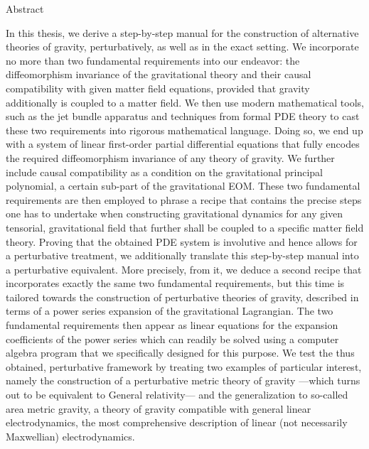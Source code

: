 \documentclass[a4paper,12pt, DIV=14, BCOR=5mm, twoside, headsepline, numbers=noenddot]{scrbook}
\newenvironment{abstract}{%
  \titlepage%
  \null\vfil%
  \begin{center}\normalfont\usekomafont{disposition}Abstract\end{center}%
}{%
  \par
  \vfil\null%
  \endtitlepage%
}
\begin{document}
\begin{abstract}
In this thesis, we derive a step-by-step manual for the construction of alternative theories of gravity, perturbatively, as well as in the exact setting. We
incorporate no more than two fundamental requirements into our endeavor: the diffeomorphism invariance of the gravitational theory and their causal compatibility with given matter field equations, provided that gravity additionally is coupled to a matter field. We then use modern mathematical tools, such as the jet bundle apparatus and techniques from formal PDE theory to cast these two requirements into rigorous mathematical language. Doing so, we end up with a system of linear first-order partial differential equations that fully encodes the required diffeomorphism invariance of any theory of gravity. We further include causal compatibility as a condition on the gravitational principal polynomial, a certain sub-part of the gravitational EOM. 
These two fundamental requirements are then employed to phrase a recipe that contains the precise steps one has to undertake when constructing gravitational dynamics for any given tensorial, gravitational field that further shall be coupled to a specific matter field theory.
Proving that the obtained PDE system is involutive and hence allows for a perturbative treatment, we additionally translate this step-by-step manual into a perturbative equivalent.
More precisely, from it, we deduce a second recipe that incorporates exactly the same two fundamental requirements, but this time is tailored towards the construction of perturbative theories of gravity, described in terms of a power series expansion of the gravitational Lagrangian. The two fundamental requirements then appear as linear equations for the expansion coefficients of the power series which can readily be solved using a computer algebra program that we specifically designed for this purpose. We test the thus obtained, perturbative framework by treating two examples of particular interest, namely the construction of a perturbative metric theory of gravity ---which turns out to be equivalent to General relativity--- and the generalization to so-called area metric gravity, a theory of gravity compatible with general linear electrodynamics, the most comprehensive description of linear (not necessarily Maxwellian) electrodynamics.
\end{abstract}
\end{document}
